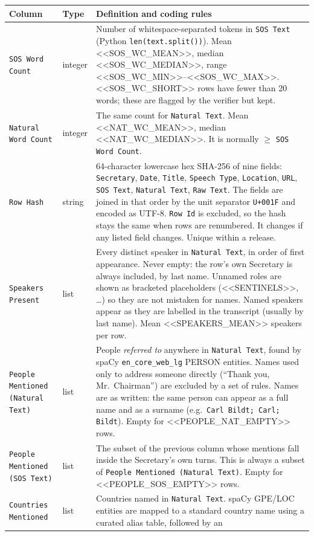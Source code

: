 \documentclass[10pt]{article}
\newcommand{\col}[1]{\texttt{#1}}
\begin{document}
\begin{longtable}{@{}L{1.25in}L{0.75in}L{4.35in}@{}}
\toprule
Column & Type & Definition and coding rules \\
\midrule
\endhead
\col{SOS Word Count} & integer & Number of whitespace-separated tokens in \col{SOS Text}
(Python \texttt{len(text.split())}). Mean <<SOS_WC_MEAN>>, median <<SOS_WC_MEDIAN>>, range <<SOS_WC_MIN>>--<<SOS_WC_MAX>>. <<SOS_WC_SHORT>> rows have
fewer than 20 words; these are flagged by the verifier but kept. \\
\col{Natural Word Count} & integer & The same count for \col{Natural Text}. Mean <<NAT_WC_MEAN>>,
median <<NAT_WC_MEDIAN>>. It is normally $\geq$ \col{SOS Word Count}. \\
\col{Row Hash} & string & 64-character lowercase hex SHA-256 of nine fields:
\col{Secretary}, \col{Date}, \col{Title}, \col{Speech Type}, \col{Location}, \col{URL},
\col{SOS Text}, \col{Natural Text}, \col{Raw Text}. The fields are joined in that order by
the unit separator \texttt{U+001F} and encoded as UTF-8. \col{Row Id} is excluded, so the
hash stays the same when rows are renumbered. It changes if any listed field changes. Unique
within a release. \\
\col{Speakers Present} & list & Every distinct speaker in \col{Natural Text}, in order of
first appearance. Never empty: the row's own Secretary is always included, by last name.
Unnamed roles are shown as bracketed placeholders (<<SENTINELS>>, \ldots) so they are not mistaken for names. Named speakers appear as they are
labelled in the transcript (usually by last name). Mean <<SPEAKERS_MEAN>> speakers per row. \\
\col{People Mentioned (Natural Text)} & list & People \emph{referred to} anywhere in
\col{Natural Text}, found by spaCy \texttt{en\_core\_web\_lg} PERSON entities. Names used
only to address someone directly (``Thank you, Mr.\ Chairman'') are excluded by a set of
rules. Names are as written: the same person can appear as a full name and as a surname
(e.g.\ \texttt{Carl Bildt; Carl; Bildt}). Empty for <<PEOPLE_NAT_EMPTY>> rows. \\
\col{People Mentioned (SOS Text)} & list & The subset of the previous column whose
mentions fall inside the Secretary's own turns. This is always a subset of
\col{People Mentioned (Natural Text)}. Empty for <<PEOPLE_SOS_EMPTY>> rows. \\
\col{Countries Mentioned} & list & Countries named in \col{Natural Text}. spaCy GPE/LOC
entities are mapped to a standard country name using a curated alias table, followed by an

\end{longtable}
\end{document}
